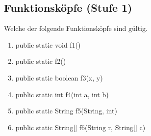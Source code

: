 \subsection{Funktionsköpfe (Stufe 1)}
Welche der folgende Funktionsköpfe sind gültig.
\begin{multicols}{2}
    \begin{enumerate}\small
        \item public static void f1()
        \item public static f2()
        \item public static boolean f3(x, y)
        \item public static int f4(int a, int b)
        \item public static String f5(String, int)
        \item public static String[] f6(String r, String[] c)
    \end{enumerate}
\end{multicols}
